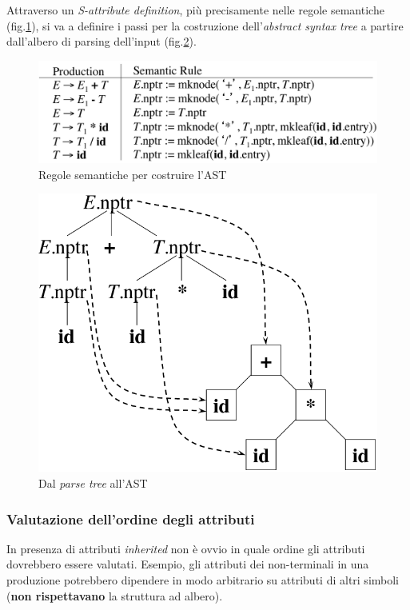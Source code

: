 Attraverso un \textit{S-attribute definition}, pi\`u precisamente nelle regole
semantiche (fig.\ref{img:semantic_rules}), si va a definire i passi per la
costruzione dell'\textit{abstract syntax tree} a partire dall'albero di parsing
dell'input (fig.\ref{img:build_AST}).

\begin{figure}[H]
  \centering
  \includegraphics[scale=0.4]{res/image/semantic_rules}
  \caption{Regole semantiche per costruire l'AST}
  \label{img:semantic_rules}
\end{figure}

\begin{figure}[H]
  \centering
  \includegraphics[scale=0.4]{res/image/build_AST}
  \caption{Dal \textit{parse tree} all'AST}
  \label{img:build_AST}
\end{figure}

\subsubsection{Valutazione dell'ordine degli attributi}
In presenza di attributi \textit{inherited} non \`e ovvio in quale ordine gli
attributi dovrebbero essere valutati. Esempio, gli attributi dei non-terminali
in una produzione potrebbero dipendere in modo arbitrario su attributi di altri
simboli (\textbf{non rispettavano} la struttura ad albero).

